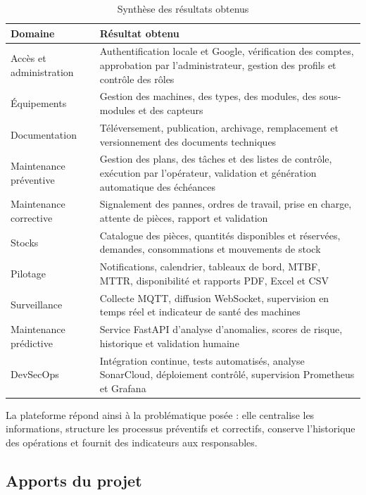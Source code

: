 \begin{table}[H]
\centering
\caption{Synthèse des résultats obtenus}
\label{tab:synthese-resultats}
\small
\begin{tabularx}{\textwidth}{|p{3.6cm}|X|}
\hline
\textbf{Domaine} & \textbf{Résultat obtenu} \\
\hline
Accès et administration &
Authentification locale et Google, vérification des comptes, approbation par l’administrateur, gestion des profils et contrôle des rôles \\
\hline
Équipements &
Gestion des machines, des types, des modules, des sous-modules et des capteurs \\
\hline
Documentation &
Téléversement, publication, archivage, remplacement et versionnement des documents techniques \\
\hline
Maintenance préventive &
Gestion des plans, des tâches et des listes de contrôle, exécution par l’opérateur, validation et génération automatique des échéances \\
\hline
Maintenance corrective &
Signalement des pannes, ordres de travail, prise en charge, attente de pièces, rapport et validation \\
\hline
Stocks &
Catalogue des pièces, quantités disponibles et réservées, demandes, consommations et mouvements de stock \\
\hline
Pilotage &
Notifications, calendrier, tableaux de bord, MTBF, MTTR, disponibilité et rapports PDF, Excel et CSV \\
\hline
Surveillance &
Collecte MQTT, diffusion WebSocket, supervision en temps réel et indicateur de santé des machines \\
\hline
Maintenance prédictive &
Service FastAPI d’analyse d’anomalies, scores de risque, historique et validation humaine \\
\hline
DevSecOps &
Intégration continue, tests automatisés, analyse SonarCloud, déploiement contrôlé, supervision Prometheus et Grafana \\
\hline
\end{tabularx}
\end{table}

La plateforme répond ainsi à la problématique posée : elle centralise les informations, structure les processus préventifs et correctifs, conserve l’historique des opérations et fournit des indicateurs aux responsables.

\subsection*{Apports du projet}

